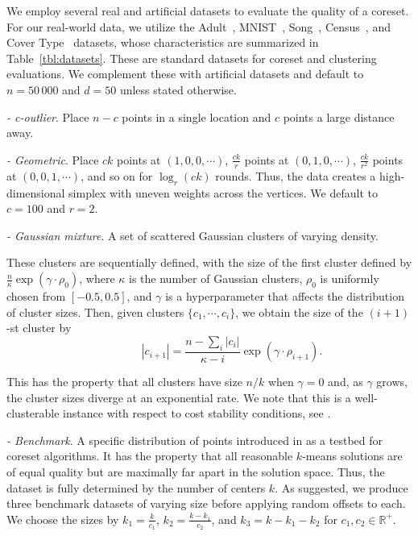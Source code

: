 We employ several real and artificial datasets to evaluate the quality of a coreset.  For our real-world data, we utilize the Adult~\cite{Dua:2019},
MNIST~\cite{mnist}, Song~\cite{song}, Census~\cite{census}, and Cover Type~\cite{covtype} datasets, whose characteristics are summarized in
Table~\ref{tbl:datasets}. These are standard datasets for coreset and clustering evaluations.
We complement these with artificial datasets and default to $n = 50\,000$ and $d=50$ unless stated otherwise.
\begin{description}
    \item \emph{- c-outlier}. Place $n-c$ points in a single location and $c$ points a large distance away.
    \item \emph{- Geometric}. Place $c k$ points at $(1, 0, 0, \cdots)$, $\frac{ck}{r}$ points at $(0, 1, 0, \cdots)$, $\frac{ck}{r^2}$ points
        at $(0, 0, 1, \cdots)$, and so on for $\log_r (ck)$ rounds. Thus, the data creates a high-dimensional simplex with uneven weights across the vertices. We
        default to $c = 100$ and $r=2$.
    \item \emph{- Gaussian mixture}. A set of scattered Gaussian clusters of varying density.

        These clusters are sequentially defined, with the size of the first cluster defined by $\frac{n}{\kappa} \exp \left( \gamma \cdot \rho_0 \right)$, where
        $\kappa$ is the number of Gaussian clusters, $\rho_0$ is uniformly chosen from $[-0.5, 0.5]$, and $\gamma$ is a hyperparameter that affects the
        distribution of cluster sizes.  Then, given clusters $\{c_1, \cdots, c_i\}$, we obtain the size of the $(i+1)$-st cluster by \[ \quad \quad \quad \quad |c_{i+1}|
        = \frac{n - \sum_i |c_i|}{\kappa - i}\exp \left( \gamma \cdot \rho_{i+1} \right).\]

        This has the property that all clusters have size $n / k$ when $\gamma = 0$ and, as $\gamma$ grows, the cluster sizes diverge at an exponential rate.
        We note that this is a well-clusterable instance with respect to cost stability conditions, see \cite{AwS12,Cohen-AddadS17,KuK10,ORSS12}.

    \item \emph{- Benchmark}. A specific distribution of points introduced in \cite{chrisESA} as a testbed for coreset algorithms.  It has the property that all
        reasonable $k$-means solutions are of equal quality but are maximally far apart in the solution space. Thus, the dataset is fully determined by the
        number of centers $k$. As suggested, we produce three benchmark datasets of varying size before applying random offsets to each. We choose the sizes by
        $k_1 = \frac{k}{c_1}$, $k_2 = \frac{k - k_1}{c_2}$, and $k_3 = k - k_1 - k_2$ for $c_1, c_2 \in \mathbb{R}^+$.

\end{description}


